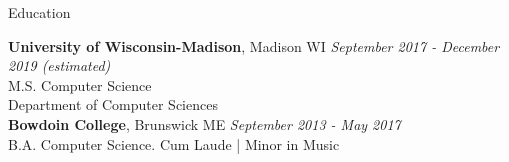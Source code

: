 \documentclass{resume} %
\begin{document}

\begin{rSection}{Education}

{\bf University of Wisconsin-Madison}, Madison WI \hfill {\em September 2017 - December 2019 (estimated)} 
\\ M.S. Computer Science
\\ Department of Computer Sciences\\

{\bf Bowdoin College}, Brunswick ME \hfill {\em September 2013 - May 2017} 
\\ B.A. Computer Science.\hfill { Cum Laude | }
Minor in Music \smallskip \\
\end{rSection}

\end{document}
